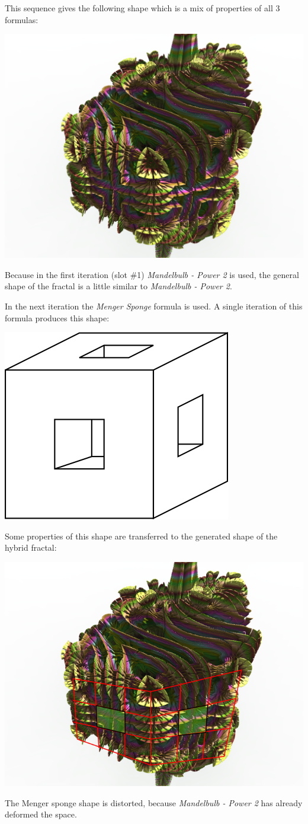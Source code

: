 This sequence gives the following shape which is a mix of properties of all 3
formulas: \nopagebreak

\includegraphics[width=0.7\linewidth]{img/manual/media/hybrid_sequence_example_1.png}

Because in the first iteration (slot \#1) \emph{Mandelbulb - Power 2} is used, the general shape
of the fractal is a little similar to \emph{Mandelbulb - Power 2}.

In the next iteration the \emph{Menger Sponge} formula is used. A single iteration
of this formula produces this shape:

\includegraphics[width=0.2\linewidth]{img/manual/media/single_iteration_of_menger_sponge.png}

Some properties of this shape are transferred to the generated shape of the hybrid fractal:

\includegraphics[width=0.5\linewidth]{img/manual/media/single_iteration_of_menger_sponge_hybrid.png}

The Menger sponge shape is distorted, because \emph{Mandelbulb - Power 2} has
already deformed the space.

